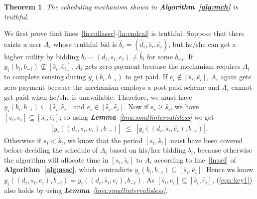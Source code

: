 \documentclass[10pt,journal,compsoc]{IEEEtran}
\newtheorem{theorem}{\textbf{Theorem}}
\begin{document}
  \begin{theorem}
    The scheduling mechanism shown in \textbf{Algorithm~\ref{alg:mch}} is truthful.\label{thm:truthful}
  \end{theorem}
\begin{IEEEproof}
    We first prove that lines~\ref{ln:callassc}-\ref{ln:endcal} is truthful. Suppose that there exists a user $A_i$ whose truthful bid is $\hat{b}_i=(\hat{d}_i,\hat{s}_i,\hat{e}_i)$, but he/she can get a higher utility by bidding $b_i=(d_i,s_i,e_i)\neq \hat{b}_i$ for some $b_{-i}$. If $y_i(b_i,b_{-i})\not\subseteq [\hat{s}_i,\hat{e}_i]$, $A_i$ gets zero payment because the mechanism requires $A_i$ to complete sensing during $y_i(b_i,b_{-i})$  to get paid. If $e_i\not\in [\hat{s}_i,\hat{e}_i]$, $A_i$ again gets zero payment because the mechanism employs a post-paid scheme and $A_i$ cannot get paid when he/she is unavailable. Therefore, we must have  $y_i(b_i,b_{-i})\subseteq [\hat{s}_i,\hat{e}_i]$ and $e_i\in [\hat{s}_i,\hat{e}_i]$. Now if $s_i\geq \hat{s}_i$, we have $[s_i,e_i]\subseteq [\hat{s}_i,\hat{e}_i]$; so using \textit{\textbf{Lemma}~\ref{lma:smallintervalisless}} we get
\begin{eqnarray}
      |y_i\left((d_i,s_i,e_i),b_{-i}\right)| &\leq& |y_i\left((d_i,\hat{s}_i,\hat{e}_i),b_{-i}\right)|.
      \label{eqn:key1}
    \end{eqnarray}
Otherwise if $s_i < \hat{s}_i$, we know that the period $[s_i, \hat{s}_i]$ must have been covered before deciding the schedule of $A_i$ based on his/her bidding $b_i$, because otherwise the algorithm will allocate time in $[s_i, \hat{s}_i]$ to $A_i$ according to line~\ref{ln:sel} of \textbf{Algorithm~\ref{alg:assc}}, which contradicts $y_i(b_i,b_{-i})\subseteq [\hat{s}_i,\hat{e}_i]$. Hence we know $y_i\left((d_i,s_i,e_i),b_{-i}\right)=y_i\left((d_i,\hat{s}_i,e_i),b_{-i}\right)$. As $[\hat{s}_i,e_i]\subseteq [\hat{s}_i,\hat{e}_i]$, (\ref{eqn:key1}) also holds by using \textit{\textbf{Lemma}~\ref{lma:smallintervalisless}}.


\end{IEEEproof}
\end{document}
